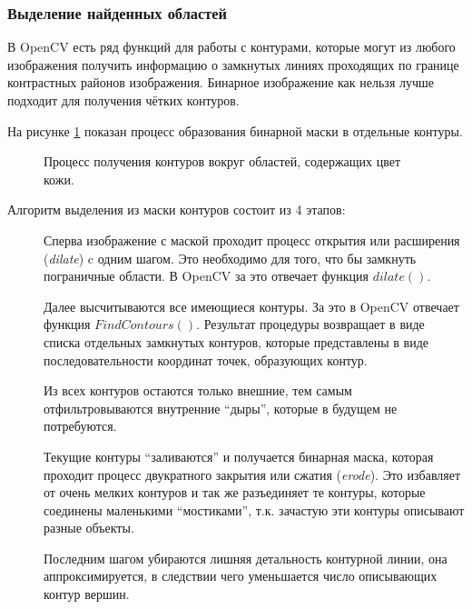 \documentclass[12pt]{report}
\begin{document}
\subsubsection{Выделение найденных областей}
В OpenCV есть ряд функций для работы с контурами, которые могут из любого изображения получить информацию о 
замкнутых 
линиях проходящих по границе контрастных районов изображения. Бинарное изображение как нельзя лучше подходит для 
получения чётких контуров.

На рисунке \ref{fig:countour_process} показан процесс образования бинарной маски в отдельные контуры.

\begin{figure}[h]
	\centering
	\caption{Процесс получения контуров вокруг областей, содержащих цвет кожи.}
	\label{fig:countour_process}
\end{figure}


Алгоритм выделения из маски контуров состоит из 4 этапов:
\begin{description}
\item[] Сперва изображение с маской проходит процесс открытия или расширения (\textit{dilate}) c 
одним шагом. Это 
необходимо для того, что бы замкнуть пограничные области. В OpenCV за это отвечает функция 
$dilate()$.
\item[] Далее высчитываются все имеющиеся контуры. За это в OpenCV отвечает функция 
$FindContours
()$. Результат 
процедуры возвращает в виде списка отдельных замкнутых контуров, которые представлены в виде последовательности 
координат точек, образующих контур.
\item[] Из всех контуров остаются только внешние, тем самым отфильтровываются внутренние ``дыры'', 
которые в 
будущем не потребуются.
\item[] Текущие контуры ``заливаются'' и получается бинарная маска, которая проходит процесс 
двукратного закрытия 
или сжатия (\textit{erode}). Это избавляет от очень мелких контуров и так же разъединяет те контуры, которые 
соединены маленькими ``мостиками'', т.к. зачастую эти контуры описывают разные объекты.
\item[] Последним шагом убираются лишняя детальность контурной линии, она аппроксимируется, в 
следствии чего 
уменьшается число описывающих контур вершин.
\end{description}
\end{document}
